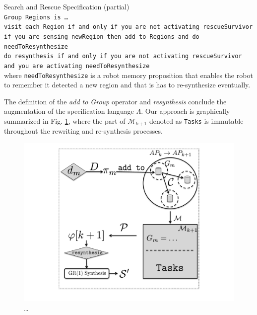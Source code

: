 \begin{myExample}\label{Ex:SnS} Search and Rescue Specification (partial)\\
	\texttt{Group Regions is \ldots}\\
	\texttt{visit each Region if and only if you are not activating rescueSurvivor}\\
	\texttt{if you are sensing newRegion then add to Regions and do needToResynthesize}\\
	\texttt{do resynthesis if and only if you are not activating rescueSurvivor and you are activating needToResynthesize}\\
	where \texttt{needToResynthesize} is a robot memory proposition that enables the robot to remember it detected a new region and that is has to re-synthesize eventually.
\end{myExample}

The definition of the \emph{add to Group} operator and \emph{resynthesis} conclude the augmentation of the specification language $\Lambda$. Our approach is graphically summarized in Fig. \ref{Fig:approach}, where  the part of $\mathcal{M}_{k+1}$ denoted as \texttt{Tasks} is immutable throughout the rewriting and re-synthesis processes.

\begin{figure}[h]
	\centering
	\includegraphics[width=0.9\columnwidth, clip]{./img/approach.pdf}
	\caption{\ldots}
	\label{Fig:approach}
\end{figure}
